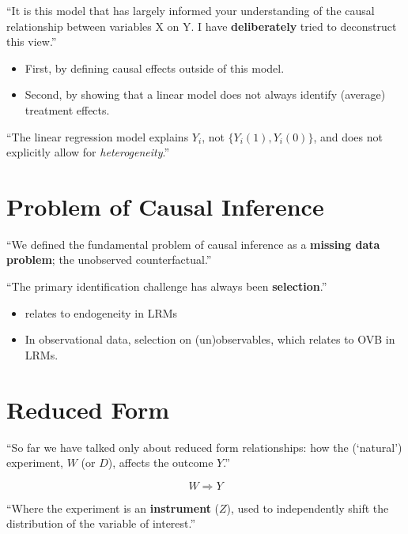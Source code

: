 \documentclass[
  letterpaper,
  DIV=11,
  numbers=noendperiod]{scrreprt}
\providecommand{\tightlist}{%
  \setlength{\itemsep}{0pt}\setlength{\parskip}{0pt}}\usepackage{longtable,booktabs,array}
\theoremstyle{definition}
\theoremstyle{remark}
\begin{document}
``It is this model that has largely informed your understanding of the
causal relationship between variables X on Y. I have
\textbf{deliberately} tried to deconstruct this view.''

\begin{itemize}
\tightlist
\item
  First, by defining causal effects outside of this model.
\item
  Second, by showing that a linear model does not always identify
  (average) treatment effects.
\end{itemize}

``The linear regression model explains \(Y_i\), not
\(\{Y_i(1),Y_i(0)\}\), and does not explicitly allow for
\emph{heterogeneity}.''

\chapter*{Problem of Causal
Inference}\label{problem-of-causal-inference}


``We defined the fundamental problem of causal inference as a
\textbf{missing data problem}; the unobserved counterfactual.''

``The primary identification challenge has always been
\textbf{selection}.''

\begin{itemize}
\tightlist
\item
  relates to endogeneity in LRMs
\item
  In observational data, selection on (un)observables, which relates to
  OVB in LRMs.
\end{itemize}

\chapter*{Reduced Form}\label{reduced-form}


``So far we have talked only about reduced form relationships: how the
(`natural') experiment, \(W\) (or \(D\)), affects the outcome \(Y\).''

\[
W \Rightarrow Y
\]

``Where the experiment is an \textbf{instrument} (\(Z\)), used to
independently shift the distribution of the variable of interest.''
\end{document}
